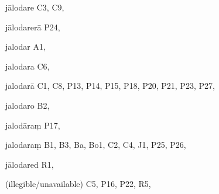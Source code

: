 \begin{marma}[hp02_009]
\begin{marma}[hp02_011]
\begin{marma}[hp02_49b]
  \begin{description}

    \end{description}
 \end{marma}

\begin{marma}[hp02_53a]
\item[jālodare] C3, C9,  
\item[jālodarerā] P24, 
\item[jalodar] A1,
\item[jalodara] C6,
\item[jalodarā] C1, C8, P13, P14, P15, P18, P20, P21, P23, P27, 
\item[jalodaro] B2,
\item[jalodāraṃ] P17,
\item[jalodaraṃ] B1, B3, Ba, Bo1, C2, C4, J1, P25, P26, 
\item[jālodared] R1,
\item[(illegible/unavailable)] C5, P16, P22, R5,

  \begin{description}

    \end{description}
 \end{marma}



\end{marma}
\end{marma}
